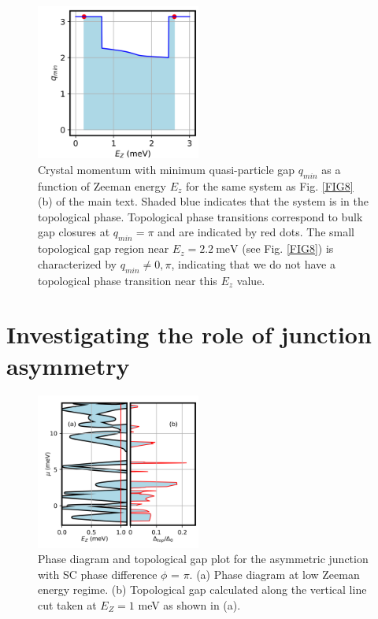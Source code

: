 \documentclass[twocolumn,aps,prb,nofootinbib]{revtex4-2}
\begin{document}
\begin{figure}[t]
\begin{center}
\includegraphics[width=0.48\textwidth]{Figures/Fig21.png}
\end{center}
\vspace{-0.5cm}
\caption{Crystal momentum with minimum quasi-particle gap $q_{min}$ as a function of Zeeman energy $E_z$ for the same system as Fig. \ref{FIG8} (b) of the main text. Shaded blue indicates that the system is in the topological phase. Topological phase transitions correspond to bulk gap closures at $q_{min} = \pi$ and are indicated by red dots. The small topological gap region near $E_z = 2.2~\text{meV}$ (see Fig. \ref{FIG8}) is characterized by $q_{min} \neq 0, \pi$, indicating that we do not have a topological phase transition near this $E_z$ value.}
\label{FIG15A}
\vspace{-1mm}
\end{figure}


\section{Investigating the role of junction asymmetry} 

\begin{figure}[t]
\begin{center}
\includegraphics[width=0.48\textwidth]{Fig13.png}
\end{center}
\vspace{-0.5cm}
\caption{Phase diagram and topological gap plot for the asymmetric junction with SC phase difference $\phi$ =  $\pi$. (a) Phase diagram at low Zeeman energy regime. (b) Topological gap calculated along the vertical line cut taken at $E_Z = 1 $ meV as shown in (a).}
\label{FIG15}
\vspace{-1mm}
\end{figure}
\end{document}
